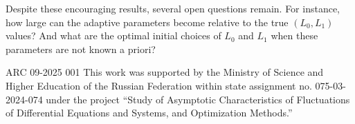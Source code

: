 \documentclass[runningheads]{llncs}
\begin{document}
	Despite these encouraging results, several open questions remain. For instance, how large can the adaptive parameters become relative to the true $(L_0,L_1)$ values? And what are the optimal initial choices of $L_0$ and $L_1$ when these parameters are not known a priori?
	
	
	\noindent  ARC 09-2025 001
	This work was supported by the Ministry of Science and Higher Education of the Russian Federation within state assignment no. 075-03-2024-074 under the project “Study of Asymptotic Characteristics of Fluctuations of Differential Equations and Systems, and Optimization Methods.”
	
	
	
	
\end{document}
